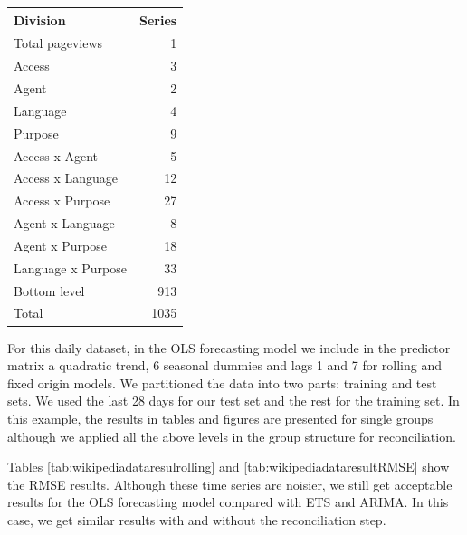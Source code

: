 \documentclass[11pt,a4paper,]{article}
\let\origtable\table
\let\endorigtable\endtable
\renewenvironment{table}[1][2] {
    \expandafter\origtable\expandafter[!htbp]
} {
    \endorigtable
}
\begin{document}
\begin{table}[!h]

\caption{\label{tab:wikidivision}Number of Wikipedia pageviews series at each aggregation level.}
\centering
\begin{tabular}[t]{lr}
\toprule
Division & Series\\
\midrule
Total pageviews & 1\\
Access & 3\\
Agent & 2\\
Language & 4\\
Purpose & 9\\
Access x Agent & 5\\
Access x Language & 12\\
Access x Purpose & 27\\
Agent x Language & 8\\
Agent x Purpose & 18\\
Language x Purpose & 33\\
Bottom level & 913\\
\hline
Total & 1035\\
\bottomrule
\end{tabular}
\end{table}

For this daily dataset, in the OLS forecasting model we include in the predictor matrix a quadratic trend, 6 seasonal dummies and lags 1 and 7 for rolling and fixed origin models. We partitioned the data into two parts: training and test sets. We used the last 28 days for our test set and the rest for the training set. In this example, the results in tables and figures are presented for single groups although we applied all the above levels in the group structure for reconciliation.

Tables \ref{tab:wikipediadataresulrolling} and \ref{tab:wikipediadataresultRMSE} show the RMSE results. Although these time series are noisier, we still get acceptable results for the OLS forecasting model compared with ETS and ARIMA. In this case, we get similar results with and without the reconciliation step.
\end{document}
